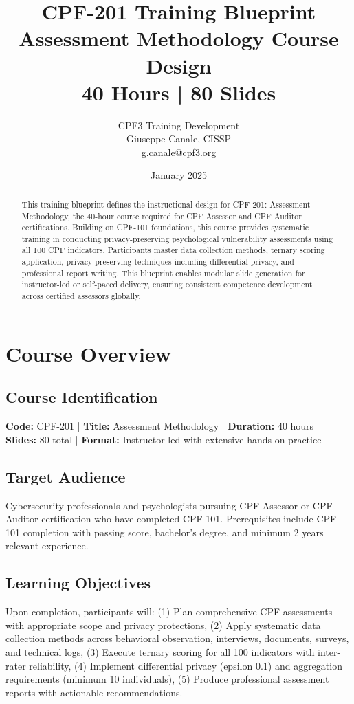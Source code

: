 \documentclass[11pt,a4paper]{article}
\title{\textbf{CPF-201 Training Blueprint}\\
\large Assessment Methodology Course Design\\
40 Hours | 80 Slides}
\author{CPF3 Training Development\\
Giuseppe Canale, CISSP\\
\small g.canale@cpf3.org}
\date{January 2025}
\begin{document}
\maketitle

\begin{abstract}
This training blueprint defines the instructional design for CPF-201: Assessment Methodology, the 40-hour course required for CPF Assessor and CPF Auditor certifications. Building on CPF-101 foundations, this course provides systematic training in conducting privacy-preserving psychological vulnerability assessments using all 100 CPF indicators. Participants master data collection methods, ternary scoring application, privacy-preserving techniques including differential privacy, and professional report writing. This blueprint enables modular slide generation for instructor-led or self-paced delivery, ensuring consistent competence development across certified assessors globally.
\end{abstract}

\tableofcontents
\newpage

\section{Course Overview}

\subsection{Course Identification}

\textbf{Code:} CPF-201 | \textbf{Title:} Assessment Methodology | \textbf{Duration:} 40 hours | \textbf{Slides:} 80 total | \textbf{Format:} Instructor-led with extensive hands-on practice

\subsection{Target Audience}

Cybersecurity professionals and psychologists pursuing CPF Assessor or CPF Auditor certification who have completed CPF-101. Prerequisites include CPF-101 completion with passing score, bachelor's degree, and minimum 2 years relevant experience.

\subsection{Learning Objectives}

Upon completion, participants will: (1) Plan comprehensive CPF assessments with appropriate scope and privacy protections, (2) Apply systematic data collection methods across behavioral observation, interviews, documents, surveys, and technical logs, (3) Execute ternary scoring for all 100 indicators with inter-rater reliability, (4) Implement differential privacy (epsilon 0.1) and aggregation requirements (minimum 10 individuals), (5) Produce professional assessment reports with actionable recommendations.
\end{document}
